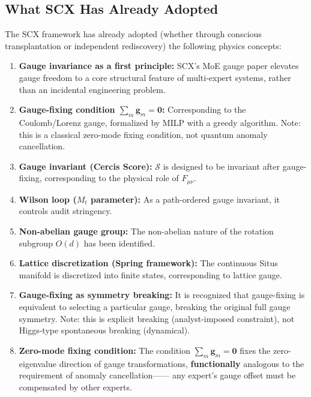 \documentclass[12pt,a4paper]{article}
\theoremstyle{remark}
\newcommand{\CercisScore}{\mathcal{S}}
\newcommand{\gaugeparam}{\mathbf{g}}
\begin{document}
\subsection{What SCX Has Already Adopted}

The SCX framework has already adopted (whether through conscious transplantation or independent rediscovery) the following physics concepts:

\begin{enumerate}[label=\textbf{Adopted \arabic*:}]
    \item \textbf{Gauge invariance as a first principle:} SCX's MoE gauge paper elevates gauge freedom to
    a core structural feature of multi-expert systems, rather than an incidental engineering problem.

    \item \textbf{Gauge-fixing condition $\sum_m \gaugeparam_m = \mathbf{0}$:}
    Corresponding to the Coulomb/Lorenz gauge, formalized by MILP with a greedy algorithm.
    Note: this is a classical zero-mode fixing condition, not quantum anomaly cancellation.

    \item \textbf{Gauge invariant (Cercis Score):} $\CercisScore$ is designed to be
    invariant after gauge-fixing, corresponding to the physical role of $F_{\mu\nu}$.

    \item \textbf{Wilson loop ($M_t$ parameter):} As a path-ordered gauge invariant,
    it controls audit stringency.

    \item \textbf{Non-abelian gauge group:} The non-abelian nature of the rotation subgroup $O(d)$ has been identified.

    \item \textbf{Lattice discretization (Spring framework):} The continuous Situs manifold is discretized into
    finite states, corresponding to lattice gauge.

    \item \textbf{Gauge-fixing as symmetry breaking:} It is recognized that gauge-fixing is equivalent to selecting a
    particular gauge, breaking the original full gauge symmetry.
    Note: this is explicit breaking (analyst-imposed constraint), not Higgs-type spontaneous breaking (dynamical).

    \item \textbf{Zero-mode fixing condition:} The condition $\sum_m \gaugeparam_m = \mathbf{0}$
    fixes the zero-eigenvalue direction of gauge transformations, \textbf{functionally} analogous to the requirement of anomaly cancellation——
    any expert's gauge offset must be compensated by other experts.
\end{enumerate}
\end{document}
